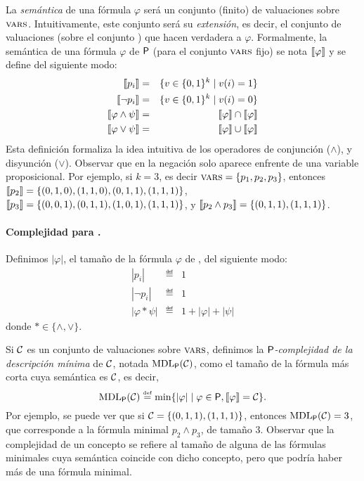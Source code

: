 La {\em semántica} de una fórmula $\varphi$ será un conjunto (finito) de valuaciones sobre $\textsc{vars}$. Intuitivamente, este conjunto será su {\em extensión}, es decir, el conjunto de valuaciones (sobre el conjunto \propvars) que hacen verdadera a $\varphi$. 
%
Formalmente, la semántica de una fórmula $\varphi$ de ${\sf P}$ (para el conjunto $\textsc{vars}$ fijo) se nota $\llbracket \varphi\rrbracket$ y se define del siguiente modo:
%
\begin{eqnarray*}
\llbracket p_i\rrbracket &=& \{ v\in\{0,1\}^k \mid v(i)=1\}\\
\llbracket \lnot p_i\rrbracket &=& \{ v\in\{0,1\}^k \mid v(i)=0\}\\
\llbracket \varphi\wedge\psi\rrbracket &=& \llbracket \varphi\rrbracket\cap\llbracket \varphi\rrbracket\\
\llbracket \varphi\vee\psi\rrbracket &=& \llbracket \varphi\rrbracket\cup\llbracket \varphi\rrbracket
\end{eqnarray*}
Esta definición formaliza la idea intuitiva de los operadores de conjunción ($\wedge$), y disyunción ($\vee$). Observar que en \grambool la negación solo aparece enfrente de una variable proposicional. Por ejemplo, si $k=3$, es decir $\textsc{vars}=\{p_1,p_2,p_3\}$, entonces $\llbracket p_2\rrbracket=\{(0,1,0), (1,1,0), (0,1,1), (1,1,1)\}$,  $\llbracket p_3\rrbracket=\{(0,0,1), (0,1,1), (1,0,1), (1,1,1)\}$, y $\llbracket p_2\wedge p_3\rrbracket=\{(0,1,1), (1,1,1)\}$.

\paragraph{Complejidad para \grambool.} Definimos $|\varphi|$, el tamaño de la fórmula $\varphi$ de \grambool, del siguiente modo:
\begin{eqnarray*}
|p_i| &\eqdef& 1\\
|\lnot p_i| &\eqdef& 1\\
|\varphi*\psi| &\eqdef& 1+|\varphi|+|\psi|
\end{eqnarray*}
donde $*\in\{\wedge,\vee\}$.

Si $\mathcal{C}$ es un conjunto de valuaciones sobre $\textsc{vars}$, definimos la {\em ${\sf P}$-complejidad de la descripción mínima} de $\mathcal{C}$, notada ${\rm MDL}_{{\sf P}}(\mathcal{C})$, como el tamaño de la fórmula más corta cuya semántica es $\mathcal{C}$, es decir,
$$
{\rm MDL}_{{\sf P}}(\mathcal{C})\stackrel{\scriptscriptstyle \mathrm{def}}{=}\min\{|\varphi|\mid \varphi\in{\sf P},\llbracket \varphi\rrbracket=\mathcal{C}\}.
$$
Por ejemplo, se puede ver que si $\mathcal{C}=\{(0,1,1), (1,1,1)\}$, entonces ${\rm MDL}_{{\sf P}}(\mathcal{C})=3$, que corresponde a la fórmula minimal $p_2\wedge p_3$, de tamaño 3. Observar que la complejidad de un concepto se refiere al tamaño de alguna de las fórmulas minimales cuya semántica coincide con dicho concepto, pero que podría haber más de una fórmula minimal.


    \color{black}